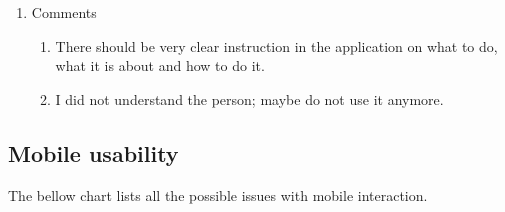 \begin{enumerate}
\item Comments
\begin{enumerate}

\item   There should be very clear instruction in the application on what to do, what it is about and how to do it.
\item   I did not understand the person; maybe do not use it anymore.


\end{enumerate}
\end{enumerate}


\subsection{Mobile usability}
The bellow chart lists all the possible issues with mobile interaction.

